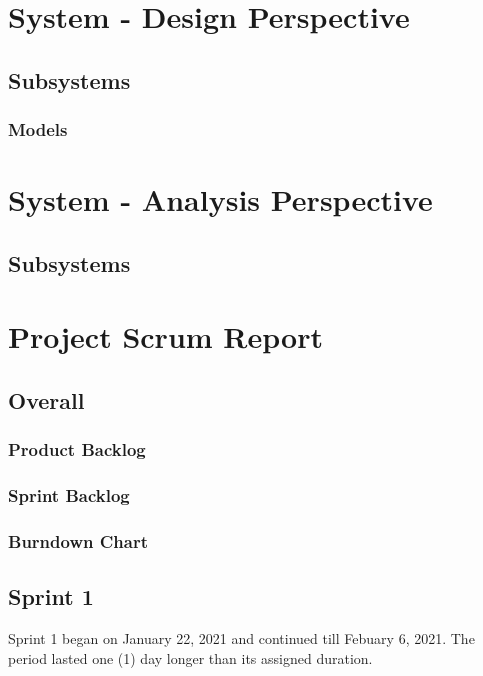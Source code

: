 \documentclass{article}
\begin{document}
\newpage
\section{System - Design Perspective}
\subsection{Subsystems}
\subsubsection{Models}


\newpage
\section{System - Analysis Perspective}
\subsection{Subsystems}

\newpage
\section{Project Scrum Report}
\subsection{Overall}
\subsubsection{Product Backlog} %

\subsubsection{Sprint Backlog} %

\subsubsection{Burndown Chart}

\subsection{Sprint 1}
Sprint 1 began on January 22, 2021 and continued till Febuary 6, 2021. The period lasted one (1) day longer than its assigned duration.
\end{document}
